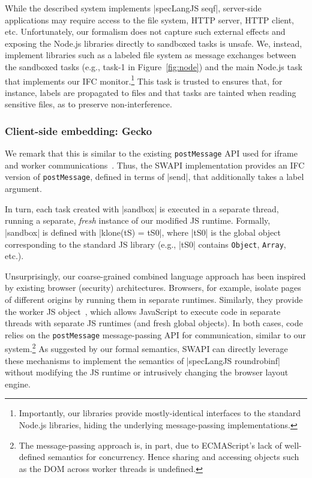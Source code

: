 While the described system implements |specLangJS seqf|, server-side
applications may require access to the file system, HTTP server, HTTP
client, etc.
%
Unfortunately, our formalism does not capture such external effects
and exposing the Node.js libraries directly to sandboxed tasks is unsafe.
%
We, instead, implement libraries such as a labeled file system as
message exchanges between the sandboxed tasks (e.g., \textsf{task-1}
in Figure~\ref{fig:node}) and the main Node.js task that implements
our IFC monitor.\footnote{
  Importantly, our libraries provide mostly-identical interfaces to
  the standard Node.js libraries, hiding the underlying
  message-passing implementations.
}
%
This task is trusted to ensures that, for instance, labels are
propagated to files and that tasks are tainted when reading sensitive
files, as to preserve non-interference.
%


\subsubsection{Client-side embedding: Gecko}

We remark that this is similar to the existing
\texttt{postMessage} API used for iframe and worker
communications~\cite{webworkers}.
%
Thus, the SWAPI implementation provides an IFC version of
\texttt{postMessage}, defined in terms of |send|, that additionally
takes a label argument.

%
In turn, each task created with |sandbox| is
executed in a separate thread, running a separate, \emph{fresh} instance of our
modified JS runtime.
%
Formally, |sandbox| is defined with |klone(tS) =
tS0|, where |tS0| is the global object corresponding to the standard
JS library (e.g., |tS0| contains \texttt{Object}, \texttt{Array},
etc.).



Unsurprisingly, our coarse-grained combined language approach has been
inspired by existing browser (security) architectures.
%
Browsers, for example, isolate pages of different origins by running
them in separate runtimes.
%
Similarly, they provide the worker JS object~\cite{webworkers}, which allows
JavaScript to execute code in separate threads with separate JS
runtimes (and fresh global objects).
%
In both cases, code relies on the \texttt{postMessage} message-passing
API for communication, similar to our system.\footnote{
  The message-passing approach is, in part, due to ECMAScript's lack
  of well-defined semantics for concurrency.
  Hence sharing and accessing objects such as the DOM across worker
  threads is undefined.
}
%
As suggested by our formal semantics, SWAPI can directly leverage these
mechanisms to implement the semantics of |specLangJS roundrobinf|
without modifying the JS runtime or intrusively changing the browser
layout engine.

